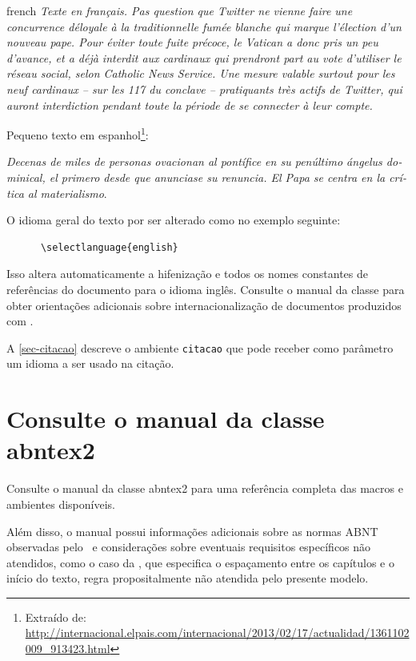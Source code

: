     \begin{otherlanguage*}{french}
    \textit{Texte en français. Pas question que Twitter ne vienne faire une
    concurrence déloyale à la traditionnelle fumée blanche qui marque l'élection
    d'un nouveau pape. Pour éviter toute fuite précoce, le Vatican a donc pris un
    peu d'avance, et a déjà interdit aux cardinaux qui prendront part au vote
    d'utiliser le réseau social, selon Catholic News Service. Une mesure valable
    surtout pour les neuf cardinaux – sur les 117 du conclave – pratiquants très
    actifs de Twitter, qui auront interdiction pendant toute la période de se
    connecter à leur compte.}
    \end{otherlanguage*}

    Pequeno texto em espanhol\footnote{Extraído de:
    \url{http://internacional.elpais.com/internacional/2013/02/17/actualidad/1361102009_913423.html}}:

    \foreignlanguage{spanish}{\textit{Decenas de miles de personas ovacionan al pontífice en su
    penúltimo ángelus dominical, el primero desde que anunciase su renuncia. El Papa se
    centra en la crítica al materialismo}}.

    O idioma geral do texto por ser alterado como no exemplo seguinte:

    \begin{verbatim}
      \selectlanguage{english}
    \end{verbatim}

    Isso altera automaticamente a hifenização e todos os nomes constantes de
    referências do documento para o idioma inglês. Consulte o manual da classe
    \cite{abntex2classe} para obter orientações adicionais sobre internacionalização de
    documentos produzidos com \abnTeX.

    A \autoref{sec-citacao} descreve o ambiente \texttt{citacao} que pode receber
    como parâmetro um idioma a ser usado na citação.

    \section{Consulte o manual da classe \textsf{abntex2}}

    Consulte o manual da classe \textsf{abntex2} \cite{abntex2classe} para uma
    referência completa das macros e ambientes disponíveis.

    Além disso, o manual possui informações adicionais sobre as normas ABNT
    observadas pelo \abnTeX\ e considerações sobre eventuais requisitos específicos
    não atendidos, como o caso da , que
    especifica o espaçamento entre os capítulos e o início do texto, regra
    propositalmente não atendida pelo presente modelo.

